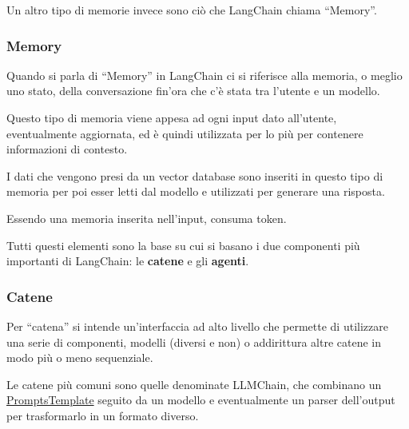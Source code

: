 Un altro tipo di memorie invece sono ciò che LangChain chiama ``Memory''.

\subsubsection{Memory}
Quando si parla di ``Memory'' in LangChain ci si riferisce alla memoria, o meglio uno stato, della conversazione fin'ora che c'è stata tra l'utente e un modello.

Questo tipo di memoria viene appesa ad ogni input dato all'utente, eventualmente aggiornata, ed è quindi utilizzata per lo più per contenere informazioni di contesto.

I dati che vengono presi da un vector database sono inseriti in questo tipo di memoria per poi esser letti dal modello e utilizzati per generare una risposta.

Essendo una memoria inserita nell'input, consuma token.

Tutti questi elementi sono la base su cui si basano i due componenti più importanti di LangChain: le \textbf{catene} e gli \textbf{agenti}.

\subsubsection*{Catene}

Per ``catena'' si intende un'interfaccia ad alto livello che permette di utilizzare una serie di componenti, modelli (diversi e non) o addirittura altre catene in modo più o meno sequenziale.

Le catene più comuni sono quelle denominate LLMChain, che combinano un \hyperref[PromptsTemplate]{PromptsTemplate} seguito da un modello e eventualmente un parser dell'output per trasformarlo in un formato diverso.

